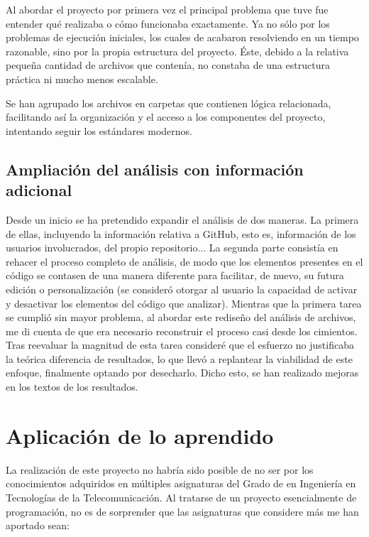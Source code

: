 \documentclass[a4paper, 12pt]{book}
\begin{document}
Al abordar el proyecto por primera vez el principal problema que tuve fue entender qué realizaba o cómo funcionaba exactamente. Ya no sólo por los problemas de ejecución iniciales, los cuales de acabaron resolviendo en un tiempo razonable, sino por la propia estructura del proyecto. Éste, debido a la relativa pequeña cantidad de archivos que contenía, no constaba de una estructura práctica ni mucho menos escalable.

Se han agrupado los archivos en carpetas que contienen lógica relacionada, facilitando así la organización y el acceso a los componentes del proyecto, intentando seguir los estándares modernos.

\subsection{Ampliación del análisis con información adicional}

Desde un inicio se ha pretendido expandir el análisis de dos maneras. La primera de ellas, incluyendo la información relativa a GitHub, esto es, información de los usuarios involucrados, del propio repositorio... La segunda parte consistía en rehacer el proceso completo de análisis, de modo que los elementos presentes en el código se contasen de una manera diferente para facilitar, de nuevo, su futura edición o personalización (se consideró otorgar al usuario la capacidad de activar y desactivar los elementos del código que analizar). Mientras que la primera tarea se cumplió sin mayor problema, al abordar este rediseño del análisis de archivos, me di cuenta de que era necesario reconstruir el proceso casi desde los cimientos. Tras reevaluar la magnitud de esta tarea consideré que el esfuerzo no justificaba la teórica diferencia de resultados, lo que llevó a replantear la viabilidad de este enfoque, finalmente optando por desecharlo. Dicho esto, se han realizado mejoras en los textos de los resultados.

\section{Aplicación de lo aprendido}
\label{sec:aplicacion}

La realización de este proyecto no habría sido posible de no ser por los conocimientos adquiridos en múltiples asignaturas del Grado de en Ingeniería en Tecnologías de la Telecomunicación. Al tratarse de un proyecto esencialmente de programación, no es de sorprender que las asignaturas que considere más me han aportado sean:
\end{document}
